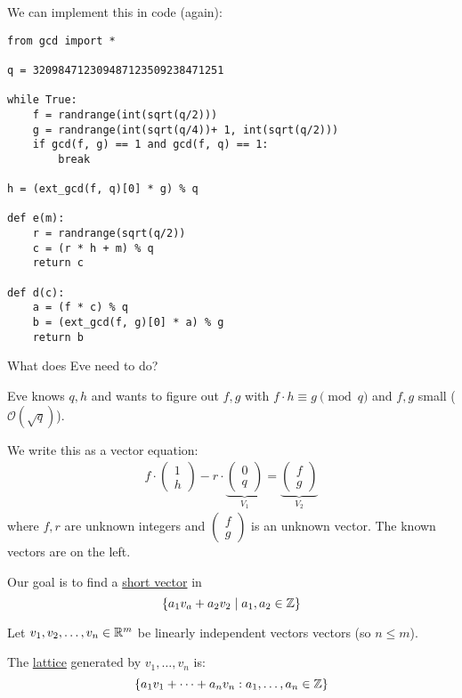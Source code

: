 We can implement this in code (again):
\begin{lstlisting}
from gcd import *

q = 320984712309487123509238471251

while True:
    f = randrange(int(sqrt(q/2)))
    g = randrange(int(sqrt(q/4))+ 1, int(sqrt(q/2)))
    if gcd(f, g) == 1 and gcd(f, q) == 1:
        break

h = (ext_gcd(f, q)[0] * g) % q

def e(m):
    r = randrange(sqrt(q/2))
    c = (r * h + m) % q
    return c

def d(c):
    a = (f * c) % q
    b = (ext_gcd(f, g)[0] * a) % g
    return b
\end{lstlisting}

\begin{ques*}
    What does Eve need to do?
\end{ques*}
Eve knows $q, h$ and wants to figure out $f, g$ with $f\cdot h\equiv g\pmod{q}$ and $f, g$ small ($\mathcal{O}(\sqrt{q})$).

We write this as a vector equation:
\begin{align*}
    f\cdot
    \begin{pmatrix}
        1 \\ h
    \end{pmatrix} - r\cdot
    \underbrace{\begin{pmatrix}
                        0 \\ q
                    \end{pmatrix}}_{V_1} =
    \underbrace{\begin{pmatrix}
                        f \\ g
                    \end{pmatrix}}_{V_2}
\end{align*}
where $f, r$ are unknown integers and $\begin{pmatrix}
        f \\ g
    \end{pmatrix}$ is an unknown vector. The known vectors are on the left.

Our goal is to find a \ul{short vector} in
\[\left\{ a_1v_a + a_2v_2\mid a_1, a_2\in\mathbb Z \right\}\]

\begin{definition}[Lattice]
    Let $v_1, v_2, \dots, v_n \in \mathbb R^m$ be linearly independent vectors vectors (so $n\leq m$).

    The \ul{lattice} generated by $v_1, \dots, v_n$ is:
    \[\left\{ a_1v_1 + \cdots + a_nv_n : a_1, \dots, a_n\in\mathbb Z \right\}\]
\end{definition}

